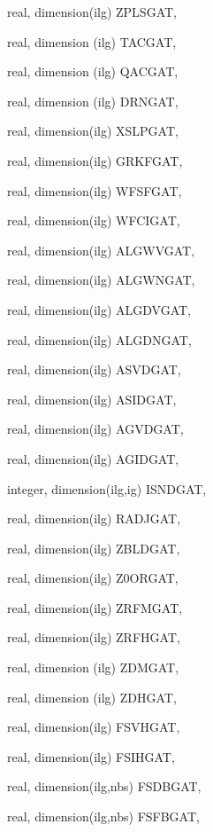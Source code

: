 {\begin{DoxyParamCaption}
\item[{real, dimension(ilg)}]{Z\+P\+L\+S\+G\+A\+T, }
\item[{real, dimension (ilg)}]{T\+A\+C\+G\+A\+T, }
\item[{real, dimension (ilg)}]{Q\+A\+C\+G\+A\+T, }
\item[{real, dimension (ilg)}]{D\+R\+N\+G\+A\+T, }
\item[{real, dimension(ilg)}]{X\+S\+L\+P\+G\+A\+T, }
\item[{real, dimension(ilg)}]{G\+R\+K\+F\+G\+A\+T, }
\item[{real, dimension(ilg)}]{W\+F\+S\+F\+G\+A\+T, }
\item[{real, dimension(ilg)}]{W\+F\+C\+I\+G\+A\+T, }
\item[{real, dimension(ilg)}]{A\+L\+G\+W\+V\+G\+A\+T, }
\item[{real, dimension(ilg)}]{A\+L\+G\+W\+N\+G\+A\+T, }
\item[{real, dimension(ilg)}]{A\+L\+G\+D\+V\+G\+A\+T, }
\item[{real, dimension(ilg)}]{A\+L\+G\+D\+N\+G\+A\+T, }
\item[{real, dimension(ilg)}]{A\+S\+V\+D\+G\+A\+T, }
\item[{real, dimension(ilg)}]{A\+S\+I\+D\+G\+A\+T, }
\item[{real, dimension(ilg)}]{A\+G\+V\+D\+G\+A\+T, }
\item[{real, dimension(ilg)}]{A\+G\+I\+D\+G\+A\+T, }
\item[{integer, dimension(ilg,ig)}]{I\+S\+N\+D\+G\+A\+T, }
\item[{real, dimension(ilg)}]{R\+A\+D\+J\+G\+A\+T, }
\item[{real, dimension(ilg)}]{Z\+B\+L\+D\+G\+A\+T, }
\item[{real, dimension(ilg)}]{Z0\+O\+R\+G\+A\+T, }
\item[{real, dimension(ilg)}]{Z\+R\+F\+M\+G\+A\+T, }
\item[{real, dimension(ilg)}]{Z\+R\+F\+H\+G\+A\+T, }
\item[{real, dimension (ilg)}]{Z\+D\+M\+G\+A\+T, }
\item[{real, dimension (ilg)}]{Z\+D\+H\+G\+A\+T, }
\item[{real, dimension(ilg)}]{F\+S\+V\+H\+G\+A\+T, }
\item[{real, dimension(ilg)}]{F\+S\+I\+H\+G\+A\+T, }
\item[{real, dimension(ilg,nbs)}]{F\+S\+D\+B\+G\+A\+T, }
\item[{real, dimension(ilg,nbs)}]{F\+S\+F\+B\+G\+A\+T, }

\end{DoxyParamCaption}}
